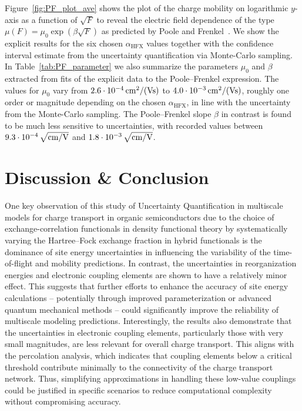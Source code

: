 \documentclass[%
 reprint,
superscriptaddress,
 amsmath,amssymb,
 aps,
prb,
floatfix
]{revtex4-2}
\newcommand{\ahfx}{\ensuremath{\alpha_\text{HFX}}\xspace}
\begin{document}
Figure~\ref{fig:PF_plot_ave} shows the plot of the charge mobility on logarithmic $y$-axis as a function of $\sqrt{F}$ to reveal the electric field dependence of the type $\mu(F)=\mu_0 \exp (\beta \sqrt{F})$ as predicted by Poole and Frenkel~\cite{frenkel_prebreakdown_1938}. We show the explicit results for the six chosen \ahfx values together with the confidence interval estimate from the uncertainty quantification via Monte-Carlo sampling. In Table~\ref{tab:PF_parameter} we also summarize the  parameters $\mu_0$ and $\beta$ extracted from fits of the explicit data to the Poole--Frenkel expression. The values for $\mu_0$ vary from $\unit[2.6\cdot 10^{-4}]{cm^2/(Vs)}$ to $\unit[4.0\cdot 10^{-3}]{cm^2/(Vs)}$, roughly one order or magnitude depending on the chosen \ahfx, in line with the uncertainty from the Monte-Carlo sampling. The Poole--Frenkel slope $\beta$ in contrast is found to be much less sensitive to uncertainties, with recorded values between $\unit[9.3\cdot 10^{-4}]{\sqrt{cm/V}}$ and $\unit[1.8\cdot 10^{-3}]{\sqrt{cm/V}}$.

\section{Discussion \& Conclusion}
One key observation of this study of Uncertainty Quantification in multiscale models for charge transport in organic semiconductors due to the choice of exchange-correlation functionals in density functional theory by systematically varying the Hartree--Fock exchange fraction in hybrid functionals is the dominance of site energy uncertainties in influencing the variability of the time-of-flight and mobility predictions. In contrast, the uncertainties in reorganization energies and electronic coupling elements are shown to have a relatively minor effect. This suggests that further efforts to enhance the accuracy of site energy calculations -- potentially through improved parameterization or advanced quantum mechanical methods -- could significantly improve the reliability of multiscale modeling predictions.   Interestingly, the results also demonstrate that the uncertainties in electronic coupling elements, particularly those with very small magnitudes, are less relevant for overall charge transport. This aligns with the percolation analysis, which indicates that coupling elements below a critical threshold contribute minimally to the connectivity of the charge transport network. Thus, simplifying approximations in handling these low-value couplings could be justified in specific scenarios to reduce computational complexity without compromising accuracy.  
\end{document}
